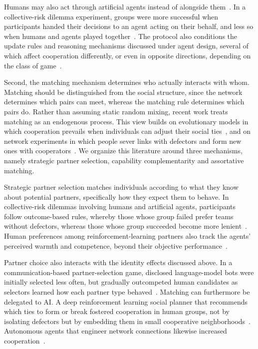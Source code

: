Humans may also act through artificial agents instead of alongside them~\cite{hanSocialPhysicsAge2026}. In a collective-risk dilemma experiment, groups were more successful when participants handed their decisions to an agent acting on their behalf, and less so when humans and agents played together~\cite{FernandezDomingos2022}. The protocol also conditions the update rules and reasoning mechanisms discussed under agent design, several of which affect cooperation differently, or even in opposite directions, depending on the class of game~\cite{mollemanEffectsConformismCultural2013, wangEvolutionaryGameDynamics2019, pereiraCounterfactualThinkingCooperation2019}.


Second, the matching mechanism determines who actually interacts with whom. Matching should be distinguished from the social structure, since the network determines which pairs can meet, whereas the matching rule determines which pairs do. Rather than assuming static random mixing, recent work treats matching as an endogenous process. This view builds on evolutionary models in which cooperation prevails when individuals can adjust their social ties~\cite{Santos2006}, and on network experiments in which people sever links with defectors and form new ones with cooperators~\cite{Rand2011}. We organize this literature around three mechanisms, namely strategic partner selection, capability complementarity and assortative matching.

Strategic partner selection matches individuals according to what they know about potential partners, specifically how they expect them to behave. In collective-risk dilemmas involving humans and artificial agents, participants follow outcome-based rules, whereby those whose group failed prefer teams without defectors, whereas those whose group succeeded become more lenient~\cite{Santos2020}. Human preferences among reinforcement-learning partners also track the agents' perceived warmth and competence, beyond their objective performance~\cite{McKee2024}.

Partner choice also interacts with the identity effects discussed above. In a communication-based partner-selection game, disclosed language-model bots were initially selected less often, but gradually outcompeted human candidates as selectors learned how each partner type behaved~\cite{jiangHumansLearnPrefer2025}. Matching can furthermore be delegated to AI. A deep reinforcement learning social planner that recommends which ties to form or break fostered cooperation in human groups, not by isolating defectors but by embedding them in small cooperative neighborhoods~\cite{McKee2023}. Autonomous agents that engineer network connections likewise increased cooperation~\cite{shiradoNetworkEngineeringUsing2020}.

